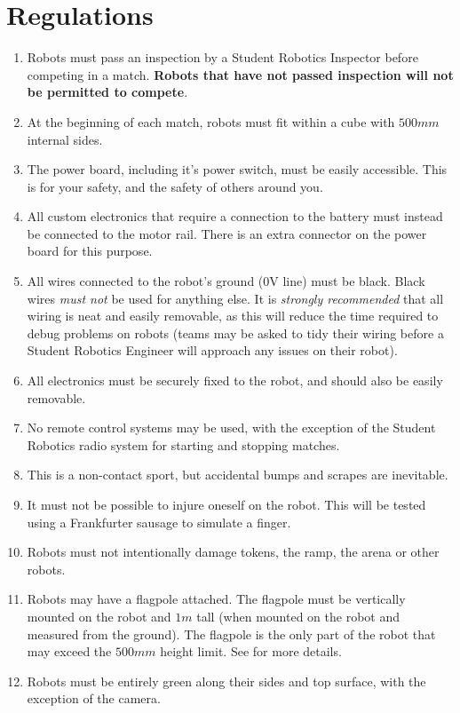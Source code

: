 \section {Regulations}
\label{sec:Regulations}

\begin{enumerate}
\item Robots must pass an inspection by a Student Robotics Inspector before competing in a match.
 \textbf{Robots that have not passed inspection will not be permitted to compete}.
\item At the beginning of each match, robots must fit within a cube with $500mm$ internal sides.
\item The power board, including it's power switch, must be easily accessible.
 This is for your safety, and the safety of others around you.
\item All custom electronics that require a connection to the battery must instead be connected to the motor rail.
 There is an extra connector on the power board for this purpose.
\item All wires connected to the robot's ground (0V line) must be black.
 Black wires \emph{must not} be used for anything else.
 It is \emph{strongly recommended} that all wiring is neat and easily removable, as this will reduce the time required to debug problems on robots
  (teams may be asked to tidy their wiring before a Student Robotics Engineer will approach any issues on their robot).
\item All electronics must be securely fixed to the robot, and should also be easily removable.
\item No remote control systems may be used, with the exception of the Student Robotics radio system for starting and stopping matches.
\item This is a non-contact sport, but accidental bumps and scrapes are inevitable.
\item It must not be possible to injure oneself on the robot.
 This will be tested using a Frankfurter sausage to simulate a finger.
\item Robots must not intentionally damage tokens, the ramp, the arena or other robots.
\item Robots may have a flagpole attached.
 The flagpole must be vertically mounted on the robot and $1m$ tall (when mounted on the robot and measured from the ground).
 The flagpole is the only part of the robot that may exceed the $500mm$ height limit.
 See  for more details.
\item Robots must be entirely green along their sides and top surface, with the exception of the camera.

\end{enumerate}
